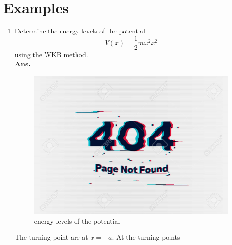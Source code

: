 \section{Examples}
\begin{enumerate}
	\item Determine the energy levels of the potential
	\begin{equation*}
		V(x) = \frac{1}{2} m \omega^2 x^2
	\end{equation*}
	using the WKB method. \\
	\textbf{Ans.}\\
	
	\begin{figure}
		\centering
		\includegraphics[width=0.5\linewidth]{Pictures/not-found.jpg}
		\caption{energy levels of the potential}
		\label{chapter22.fig6}
	\end{figure}
	
	The turning point are at $x=\pm a$. At the turning points
	

\end{enumerate}
